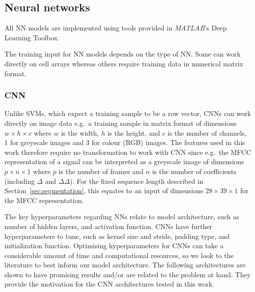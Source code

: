 \subsection{Neural networks}

All NN models are implemented using tools provided in \textit{MATLAB}'s Deep
Learning Toolbox.

The training input for NN models depends on the type of NN\@. Some can work
directly on cell arrays whereas others require training data in numerical matrix
format.

\subsubsection{CNN}\label{sssec:method:cnn}

Unlike SVMs, which expect a training sample to be a row vector, CNNs can work
directly on image data e.g.\ a training sample in matrix format of dimensions
$w \times h \times c$ where $w$ is the width, $h$ is the height, and $c$ is the
number of channels, 1 for greyscale images and 3 for colour (RGB) images. The
features used in this work therefore require no transformation to work with CNN
since e.g.\ the MFCC representation of a signal can be interpreted as a
greyscale image of dimensions $p \times n \times 1$ where $p$ is the number of
frames and $n$ is the number of coefficients (including $\Delta$ and
$\Delta\Delta$). For the fixed sequence length described in
Section~\ref{sec:segmentation}, this equates to an input of dimensions $28
\times 39 \times 1$ for the MFCC representation.

The key hyperparameters regarding NNs relate to model architecture, such as
number of hidden layers, and activation function. CNNs have further
hyperparameters to tune, such as kernel size and stride, padding type, and
initialization function. Optimising hyperparameters for CNNs can take a
considerable amount of time and computational resources, so we look to the
literature to best inform our model architecture. The following architectures are
shown to have promising results and/or are related to the problem at hand. They
provide the motivation for the CNN architectures tested in this work.

